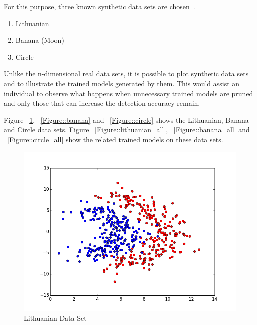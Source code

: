 For this purpose, three known synthetic data sets are chosen~\cite{Duin2000}. 
\begin{enumerate}
  \item Lithuanian
  \item Banana (Moon)
  \item Circle
\end{enumerate}  

Unlike the n-dimensional real data sets, it is possible to plot synthetic data sets and to illustrate the trained models generated by them. This would assist an individual to observe what happens when unnecessary trained models are pruned and only those that can increase the detection accuracy remain.

Figure ~\ref{Figure::lithuanian}, ~\ref{Figure::banana} and ~\ref{Figure::circle} shows the Lithuanian, Banana and Circle data sets. 
Figure ~\ref{Figure::lithuanian_all}, ~\ref{Figure::banana_all} and ~\ref{Figure::circle_all} show the related trained models on these data sets.

\begin{figure}[]
\centering
\includegraphics[scale=0.6]{figs/dataset_Lithuanian}
\caption{Lithuanian Data Set}
\label{Figure::lithuanian}
\end{figure}

